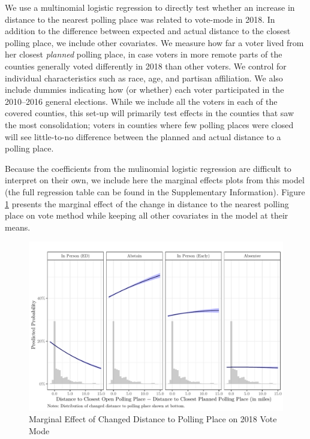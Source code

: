 \documentclass[
  12pt,
]{article}
\begin{document}
We use a multinomial logistic regression to directly test whether an increase in distance to the nearest polling place was related to vote-mode in 2018. In addition to the difference between expected and actual distance to the closest polling place, we include other covariates. We measure how far a voter lived from her closest \emph{planned} polling place, in case voters in more remote parts of the counties generally voted differently in 2018 than other voters. We control for individual characteristics such as race, age, and partisan affiliation. We also include dummies indicating how (or whether) each voter participated in the 2010--2016 general elections. While we include all the voters in each of the covered counties, this set-up will primarily test effects in the counties that saw the most consolidation; voters in counties where few polling places were closed will see little-to-no difference between the planned and actual distance to a polling place.

Because the coefficients from the mulinomial logistic regression are difficult to interpret on their own, we include here the marginal effects plots from this model (the full regression table can be found in the Supplementary Information). Figure \ref{fig:marg-multi} presents the marginal effect of the change in distance to the nearest polling place on vote method while keeping all other covariates in the model at their means.

\begin{figure}[h]

{\centering \includegraphics{hurricane_michael_files/figure-latex/marg-multi-1} 

}

\caption{\label{fig:marg-multi}Marginal Effect of Changed Distance to Polling Place on 2018 Vote Mode}\label{fig:marg-multi}
\end{figure}
\end{document}
